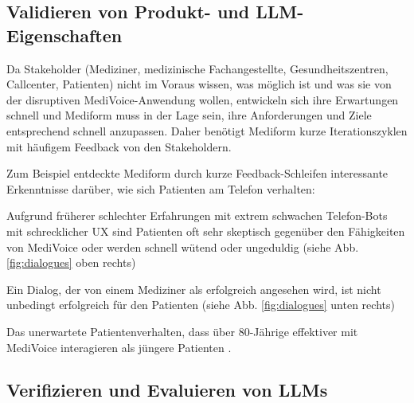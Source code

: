\documentclass[twocolumn]{article}
\begin{document}
\subsection{Validieren von Produkt- und LLM-Eigenschaften}

Da Stakeholder (Mediziner, medizinische Fachangestellte, Gesundheitszentren, Callcenter, Patienten) nicht im Voraus wissen, was möglich ist und was sie von der disruptiven MediVoice-Anwendung wollen, entwickeln sich ihre Erwartungen schnell und Mediform muss in der Lage sein, ihre Anforderungen und Ziele entsprechend schnell anzupassen. Daher benötigt Mediform kurze Iterationszyklen mit häufigem Feedback von den Stakeholdern.

Zum Beispiel entdeckte Mediform durch kurze Feedback-Schleifen interessante Erkenntnisse darüber, wie sich Patienten am Telefon verhalten:
\begin{compactitem}
\item Aufgrund früherer schlechter Erfahrungen mit extrem schwachen Telefon-Bots mit schrecklicher UX sind Patienten oft sehr skeptisch gegenüber den Fähigkeiten von MediVoice oder werden schnell wütend oder ungeduldig  (siehe Abb. \ref{fig:dialogues} oben rechts)
\item Ein Dialog, der von einem Mediziner als erfolgreich angesehen wird, ist nicht unbedingt erfolgreich für den Patienten (siehe Abb. \ref{fig:dialogues} unten rechts)
\item Das unerwartete Patientenverhalten, dass über 80-Jährige effektiver mit MediVoice interagieren als jüngere Patienten \cite{Mediform24}.
\end{compactitem}

\subsection{Verifizieren und Evaluieren von LLMs}
\label{sec:verifyandevaluatellms}
\end{document}
